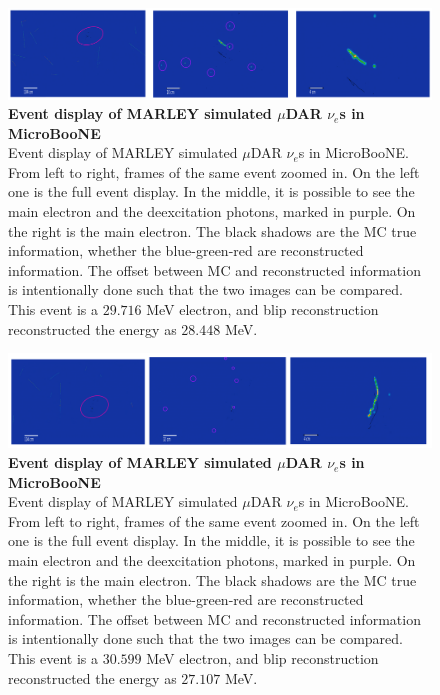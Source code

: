 \begin{figure}[h!]
    \centering
    \includegraphics[width=\textwidth]{Figures/signal_evd_1.jpeg}
    \caption[Event display of MARLEY simulated $\mu$DAR $\nu_e$s in MicroBooNE]{{\textbf{Event display of MARLEY simulated $\mu$DAR $\nu_e$s in MicroBooNE}}\\ Event display of MARLEY simulated $\mu$DAR $\nu_e$s in MicroBooNE. From left to right, frames of the same event zoomed in. On the left one is the full event display. In the middle, it is possible to see the main electron and the deexcitation photons, marked in purple. On the right is the main electron. The black shadows are the MC true information, whether the blue-green-red are reconstructed information. The offset between MC and reconstructed information is intentionally done such that the two images can be compared. This event is a $29.716$ MeV electron, and blip reconstruction reconstructed the energy as $28.448$ MeV.}
    \label{signal_evd_1}
\end{figure}

\begin{figure}[h!]
    \centering
    \includegraphics[width=\textwidth]{Figures/signal_evd_2.jpeg}
    \caption[Event display of MARLEY simulated $\mu$DAR $\nu_e$s in MicroBooNE]{{\textbf{Event display of MARLEY simulated $\mu$DAR $\nu_e$s in MicroBooNE}}\\ Event display of MARLEY simulated $\mu$DAR $\nu_e$s in MicroBooNE. From left to right, frames of the same event zoomed in. On the left one is the full event display. In the middle, it is possible to see the main electron and the deexcitation photons, marked in purple. On the right is the main electron. The black shadows are the MC true information, whether the blue-green-red are reconstructed information. The offset between MC and reconstructed information is intentionally done such that the two images can be compared. This event is a $30.599$ MeV electron, and blip reconstruction reconstructed the energy as $27.107$ MeV.}
 \label{signal_evd_2}
\end{figure}

